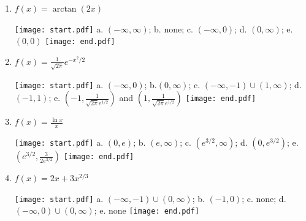 \documentclass[12pt]{article}
\begin{document}
\begin{enumerate}
\item $f(x) = \arctan{(2x)}$ 

\texttt{[image: start.pdf]}
{{a. $(-\infty,\infty)$; b. none; c. $(-\infty,0)$; d. $(0,\infty)$; e. $(0,0)$}}
\texttt{[image: end.pdf]}


\item $f(x)=\frac{1}{\sqrt{2\pi}}e^{-x^2/2}$

\texttt{[image: start.pdf]}
{{a. $(-\infty,0)$; b.$(0,\infty)$; c. $(-\infty,-1) \cup (1,\infty)$; d. $(-1,1)$; e. $\left(-1,\frac{1}{\sqrt{2\pi} e^{1/2}}\right)$ and $\left(1,\frac{1}{\sqrt{2\pi} e^{1/2}}\right)$}}
\texttt{[image: end.pdf]}


\item $f(x)=\frac{\ln{x}}{x}$

\texttt{[image: start.pdf]}
{{a. $(0,e)$; b. $(e,\infty)$; c. $(e^{3/2},\infty)$; d. $(0,e^{3/2})$; e. $\left(e^{3/2},\frac{3}{2e^{3/2}}\right)$}}
\texttt{[image: end.pdf]}


\item $f(x)=2x+3x^{2/3}$

\texttt{[image: start.pdf]}
{{a. $(-\infty,-1) \cup (0,\infty)$; b. $(-1,0)$; c. none; d. $(-\infty,0) \cup (0,\infty)$; e. none}}
\texttt{[image: end.pdf]}


\end{enumerate}

\end{document}
